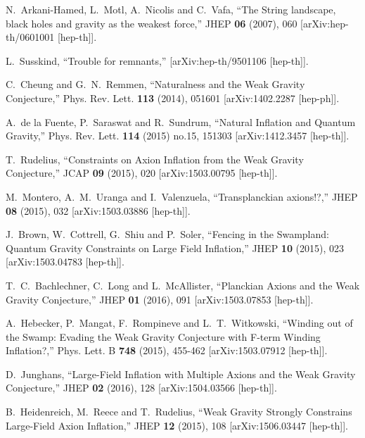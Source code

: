 \documentclass[12pt]{article}
\numberwithin{equation}{section}
\begin{document}
\begin{thebibliography}{999}
N.~Arkani-Hamed, L.~Motl, A.~Nicolis and C.~Vafa,
``The String landscape, black holes and gravity as the weakest force,''
JHEP \textbf{06} (2007), 060
[arXiv:hep-th/0601001 [hep-th]].

L.~Susskind, ``Trouble for remnants,'' [arXiv:hep-th/9501106 [hep-th]].

C.~Cheung and G.~N.~Remmen,
``Naturalness and the Weak Gravity Conjecture,''
Phys. Rev. Lett. \textbf{113} (2014), 051601
[arXiv:1402.2287 [hep-ph]].

A.~de la Fuente, P.~Saraswat and R.~Sundrum,
``Natural Inflation and Quantum Gravity,''
Phys. Rev. Lett. \textbf{114} (2015) no.15, 151303
[arXiv:1412.3457 [hep-th]].

T.~Rudelius,
``Constraints on Axion Inflation from the Weak Gravity Conjecture,''
JCAP \textbf{09} (2015), 020
[arXiv:1503.00795 [hep-th]].

M.~Montero, A.~M.~Uranga and I.~Valenzuela,
``Transplanckian axions!?,''
JHEP \textbf{08} (2015), 032
[arXiv:1503.03886 [hep-th]].

J.~Brown, W.~Cottrell, G.~Shiu and P.~Soler,
``Fencing in the Swampland: Quantum Gravity Constraints on Large Field Inflation,''
JHEP \textbf{10} (2015), 023
[arXiv:1503.04783 [hep-th]].

T.~C.~Bachlechner, C.~Long and L.~McAllister,
``Planckian Axions and the Weak Gravity Conjecture,''
JHEP \textbf{01} (2016), 091
[arXiv:1503.07853 [hep-th]].

A.~Hebecker, P.~Mangat, F.~Rompineve and L.~T.~Witkowski,
``Winding out of the Swamp: Evading the Weak Gravity Conjecture with F-term Winding Inflation?,''
Phys. Lett. B \textbf{748} (2015), 455-462
[arXiv:1503.07912 [hep-th]].

D.~Junghans,
``Large-Field Inflation with Multiple Axions and the Weak Gravity Conjecture,''
JHEP \textbf{02} (2016), 128
[arXiv:1504.03566 [hep-th]].

B.~Heidenreich, M.~Reece and T.~Rudelius,
``Weak Gravity Strongly Constrains Large-Field Axion Inflation,''
JHEP \textbf{12} (2015), 108
[arXiv:1506.03447 [hep-th]].


\end{thebibliography}
\end{document}
